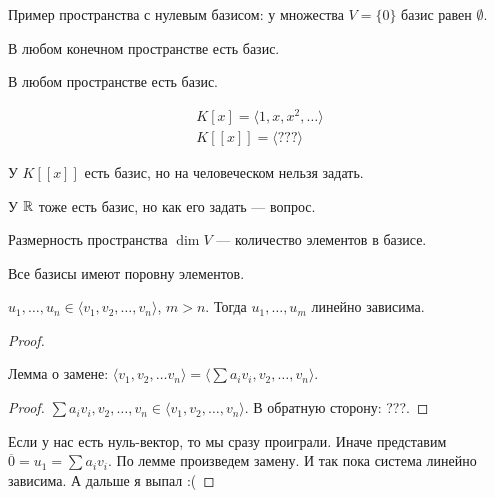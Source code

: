 \begin{remark}
    Пример пространства с нулевым базисом: у множества $V = \{ 0 \}$ базис равен  $\emptyset$.
\end{remark}
\begin{consequence}
    В любом конечном пространстве есть базис.
\end{consequence}
\begin{remark}
    В любом пространстве есть базис.
\end{remark}
\begin{example}
    \begin{align*}
        K[x] = \langle 1, x, x^2,  \ldots \rangle \\
        K[[x]] = \langle ??? \rangle
    \end{align*}

    У $K[[x]]$ есть базис, но на человеческом нельзя задать.
    
    У $\mathbb{R}$ тоже есть базис, но как его задать --- вопрос.
\end{example}
\begin{definition}
    Размерность пространства $\dim V$ --- количество элементов в базисе.
\end{definition}
\begin{theorem}
    Все базисы имеют поровну элементов.
\end{theorem}
\begin{lemma}
    $u_1, \ldots, u_n \in \langle v_1, v_2, \ldots, v_n \rangle$, $m > n$. Тогда  $u_1, \ldots, u_m$ линейно зависима.
\end{lemma}
\begin{proof}
    \begin{lemma}
        Лемма о замене: $\langle v_1, v_2, \ldots v_n \rangle = \langle \sum a_i v_i, v_2, \ldots, v_n \rangle$.
    \end{lemma}
    \begin{proof}
        $\sum a_i v_i, v_2, \ldots, v_n \in \langle v_1, v_2, \ldots, v_n \rangle$. В обратную сторону: ???.
    \end{proof}
    
    Если у нас есть нуль-вектор, то мы сразу проиграли. Иначе представим $\overline{0} = u_1 = \sum a_i v_i$. По лемме произведем замену. И так пока система линейно зависима. А дальше я выпал :(
\end{proof}
